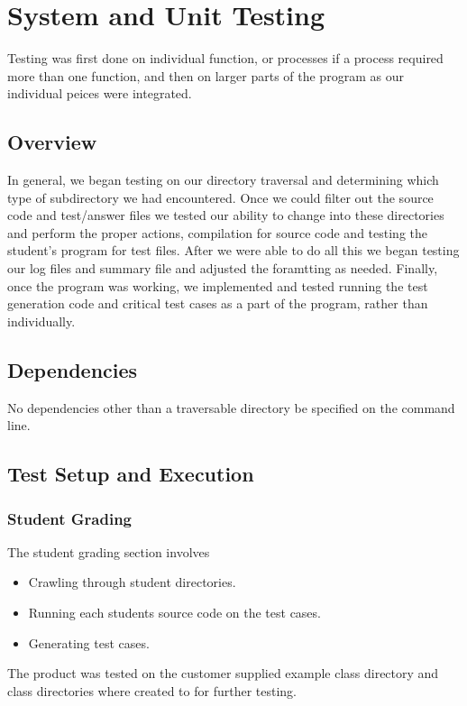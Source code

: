 
\chapter{System and Unit Testing}

Testing was first done on individual function, or processes if a process required more than one function, and then on larger parts of the program as our individual peices were integrated. 

\section{Overview}
In general, we began testing on our directory traversal and determining which type of subdirectory we had encountered. Once we could filter out the source code and test/answer files we tested our ability to change into these directories and perform the proper actions, compilation for source code and testing the student's program for test files. After we were able to do all this we began testing our log files and summary file and adjusted the foramtting as needed. Finally, once the program was working, we implemented and tested running the test generation code and critical test cases as a part of the program, rather than individually. 


\section{Dependencies}
No dependencies other than a traversable directory be specified on the command line.  


\section{Test Setup and Execution}
\subsection{Student Grading}
The student grading section involves
\begin{itemize}
\item Crawling through student directories.
\item Running each students source code on the test cases.
\item Generating test cases.
\end{itemize}
The product was tested on the customer supplied example class directory and class directories where created to for further testing.

